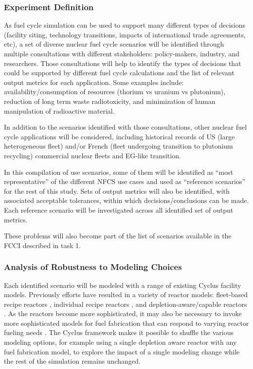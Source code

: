 \subsubsection{Experiment Definition}

As fuel cycle simulation can be used to support many different types of
decisions (facility siting, technology transitions, impacts of international
trade agreements, etc), a set of diverse nuclear fuel cycle scenarios will be
identified through multiple consultations with different stakeholders:
policy-makers, industry, and researchers.  Those consultations will help to
identify the types of decisions that could be supported by different fuel
cycle calculations and the list of relevant output metrics for each
application.  Some examples include: availability/consumption of resources
(thorium vs uranium vs plutonium), reduction of long term waste
radiotoxicity, and minimization of human manipulation of radioactive material.

In addition to the scenarios identified with those consultations, other
nuclear fuel cycle applications will be considered, including historical
records of US (large heterogeneous fleet) and/or French (fleet undergoing
transition to plutonium recycling)\cite{CLASS group work on this} commercial
nuclear fleets and EG-like transition\cite{Bo.ANSW.2016}.

In this compilation of use scenarios, some of them will be identified as
``most representative'' of the different \gls{NFCS} use cases and used as
``reference scenarios'' for the rest of this study. Sets of output metrics
will also be identified, with associated acceptable tolerances, within which
decisions/conclusions can be made. Each reference scenario will be
investigated across all identified set of output metrics.

These problems will also become part of the list of scenarios available in the
\gls{FCCI} described in task 1.

\subsubsection{Analysis of Robustness to Modeling Choices}

Each identified scenario will be modeled with a range of existing Cyclus
facility models.  Previously efforts have resulted in a variety of reactor
models: fleet-based recipe reactors \cite{carlsen.NT.2016}, individual recipe
reactors \cite{cycamore.1.5.0}, and depletion-aware/capable reactors
\cite{cyborg, brightlite.2015, cyclass.2016}.  As the reactors become more
sophisticated, it may also be necessary to invoke more sophisticated models for
fuel fabrication that can respond to varying reactor fueling needs
\cite{brightlite.2015, cyclass.2016}. The Cyclus framework makes it possible to
shuffle the various modeling options, for example using a single depletion aware
reactor with any fuel fabrication model, to explore the impact of a single
modeling change while the rest of the simulation remains unchanged.

